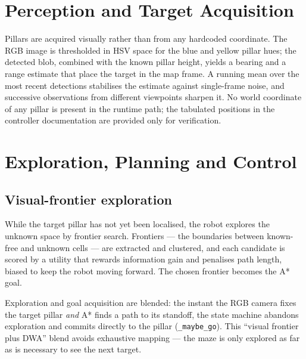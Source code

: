 \documentclass[11pt,a4paper]{article}
\newcommand{\code}[1]{\colorbox{codegray}{\texttt{\small #1}}}
\begin{document}
\section{Perception and Target Acquisition}

Pillars are acquired visually rather than from any hardcoded coordinate. The RGB
image is thresholded in HSV space for the blue and yellow pillar hues; the
detected blob, combined with the known pillar height, yields a bearing and a
range estimate that place the target in the map frame. A running mean over the
most recent detections stabilises the estimate against single-frame noise, and
successive observations from different viewpoints sharpen it. No world
coordinate of any pillar is present in the runtime path; the tabulated
positions in the controller documentation are provided only for verification.

\section{Exploration, Planning and Control}

\subsection{Visual-frontier exploration}
While the target pillar has not yet been localised, the robot explores the
unknown space by frontier search. Frontiers --- the boundaries between
known-free and unknown cells --- are extracted and clustered, and each candidate
is scored by a utility that rewards information gain and penalises path length,
biased to keep the robot moving forward. The chosen frontier becomes the A*
goal.

Exploration and goal acquisition are blended: the instant the RGB camera fixes
the target pillar \emph{and} A* finds a path to its standoff, the state machine
abandons exploration and commits directly to the pillar
(\code{\_maybe\_go}). This ``visual frontier plus DWA'' blend avoids exhaustive
mapping --- the maze is only explored as far as is necessary to see the next
target.
\end{document}
